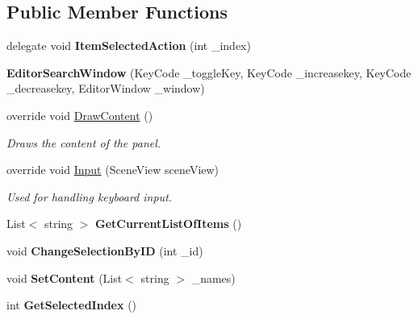 \subsection*{Public Member Functions}
\begin{DoxyCompactItemize}
\item 
delegate void {\bfseries Item\+Selected\+Action} (int \+\_\+index)\hypertarget{class_editor_search_window_a6559bfb1aef1d34bebb0f0cff5bd5755}{}\label{class_editor_search_window_a6559bfb1aef1d34bebb0f0cff5bd5755}

\item 
{\bfseries Editor\+Search\+Window} (Key\+Code \+\_\+toggle\+Key, Key\+Code \+\_\+increasekey, Key\+Code \+\_\+decreasekey, Editor\+Window \+\_\+window)\hypertarget{class_editor_search_window_a694a526389f090f0a27c352aa86a4e31}{}\label{class_editor_search_window_a694a526389f090f0a27c352aa86a4e31}

\item 
override void \hyperlink{class_editor_search_window_a31b2db7b66d3e97910ec8ad403b55a6a}{Draw\+Content} ()
\begin{DoxyCompactList}\small\item\em Draws the content of the panel. \end{DoxyCompactList}\item 
override void \hyperlink{class_editor_search_window_a7eae97a116499dd637254664c1cf3b81}{Input} (Scene\+View scene\+View)
\begin{DoxyCompactList}\small\item\em Used for handling keyboard input. \end{DoxyCompactList}\item 
List$<$ string $>$ {\bfseries Get\+Current\+List\+Of\+Items} ()\hypertarget{class_editor_search_window_a0f570149223f51b5d5b84b9e6af06528}{}\label{class_editor_search_window_a0f570149223f51b5d5b84b9e6af06528}

\item 
void {\bfseries Change\+Selection\+By\+ID} (int \+\_\+id)\hypertarget{class_editor_search_window_af67fad630c4ac078ddea59c6e0127b91}{}\label{class_editor_search_window_af67fad630c4ac078ddea59c6e0127b91}

\item 
void {\bfseries Set\+Content} (List$<$ string $>$ \+\_\+names)\hypertarget{class_editor_search_window_ac133710678888084f8ac5ef0bd50c988}{}\label{class_editor_search_window_ac133710678888084f8ac5ef0bd50c988}

\item 
int {\bfseries Get\+Selected\+Index} ()\hypertarget{class_editor_search_window_ac61b64824099e66637659c7922e1b05d}{}\label{class_editor_search_window_ac61b64824099e66637659c7922e1b05d}

\end{DoxyCompactItemize}

